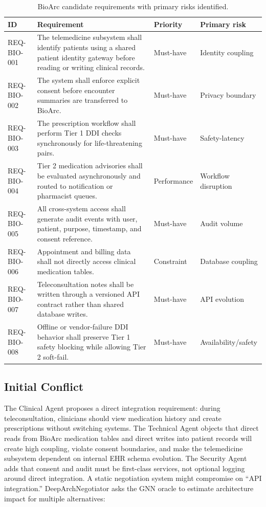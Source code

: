\documentclass[english,preprint,nonatbib]{elsarticle}
\begin{document}
\begin{longtable}{p{2.2cm}p{8.4cm}p{2cm}p{3cm}}
\caption{BioArc candidate requirements with primary risks identified.}\label{tab:bioarc-reqs}\\
\toprule
ID & Requirement & Priority & Primary risk \\
\midrule
REQ-BIO-001 & The telemedicine subsystem shall identify patients using a shared patient identity gateway before reading or writing clinical records.
& Must-have & Identity coupling \\
REQ-BIO-002 & The system shall enforce explicit consent before encounter summaries are transferred to BioArc.
& Must-have & Privacy boundary \\
REQ-BIO-003 & The prescription workflow shall perform Tier 1 DDI checks synchronously for life-threatening pairs.
& Must-have & Safety-latency \\
REQ-BIO-004 & Tier 2 medication advisories shall be evaluated asynchronously and routed to notification or pharmacist queues.
& Performance & Workflow disruption \\
REQ-BIO-005 & All cross-system access shall generate audit events with user, patient, purpose, timestamp, and consent reference.
& Must-have & Audit volume \\
REQ-BIO-006 & Appointment and billing data shall not directly access clinical medication tables.
& Constraint & Database coupling \\
REQ-BIO-007 & Teleconsultation notes shall be written through a versioned API contract rather than shared database writes.
& Must-have & API evolution \\
REQ-BIO-008 & Offline or vendor-failure DDI behavior shall preserve Tier 1 safety blocking while allowing Tier 2 soft-fail.
& Must-have & Availability/safety \\
\bottomrule
\end{longtable}

\subsection{Initial Conflict}

The Clinical Agent proposes a direct integration requirement: during teleconsultation, clinicians should view medication history and create prescriptions without switching systems.
The Technical Agent objects that direct reads from BioArc medication tables and direct writes into patient records will create high coupling, violate consent boundaries, and make the telemedicine subsystem dependent on internal EHR schema evolution.
The Security Agent adds that consent and audit must be first-class services, not optional logging around direct integration.
A static negotiation system might compromise on ``API integration.'' DeepArchNegotiator asks the GNN oracle to estimate architecture impact for multiple alternatives:
\end{document}
